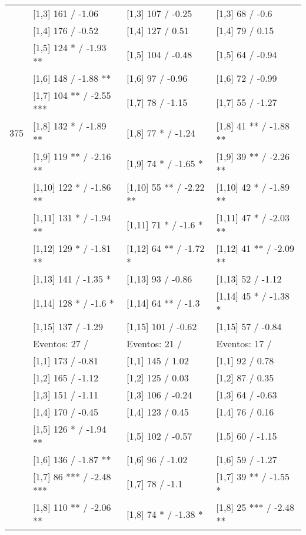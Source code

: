 \begin{table}
\begin{tabular}[t]{llll}
 & {}[1,3] 161  / -1.06 & {}[1,3] 107  / -0.25 & {}[1,3] 68  / -0.6\\
\addlinespace
 & {}[1,4] 176  / -0.52 & {}[1,4] 127  / 0.51 & {}[1,4] 79  / 0.15\\
 & {}[1,5] 124 * / -1.93 ** & {}[1,5] 104  / -0.48 & {}[1,5] 64  / -0.94\\
 & {}[1,6] 148  / -1.88 ** & {}[1,6] 97  / -0.96 & {}[1,6] 72  / -0.99\\
 & {}[1,7] 104 ** / -2.55 *** & {}[1,7] 78  / -1.15 & {}[1,7] 55  / -1.27\\
375 & {}[1,8] 132 * / -1.89 ** & {}[1,8] 77 * / -1.24 & {}[1,8] 41 ** / -1.88 **\\
\addlinespace
 & {}[1,9] 119 ** / -2.16 ** & {}[1,9] 74 * / -1.65 * & {}[1,9] 39 ** / -2.26 **\\
 & {}[1,10] 122 * / -1.86 ** & {}[1,10] 55 ** / -2.22 ** & {}[1,10] 42 * / -1.89 **\\
 & {}[1,11] 131 * / -1.94 ** & {}[1,11] 71 * / -1.6 * & {}[1,11] 47 * / -2.03 **\\
 & {}[1,12] 129 * / -1.81 ** & {}[1,12] 64 ** / -1.72 * & {}[1,12] 41 ** / -2.09 **\\
 & {}[1,13] 141  / -1.35 * & {}[1,13] 93  / -0.86 & {}[1,13] 52  / -1.12\\
\addlinespace
 & {}[1,14] 128 * / -1.6 * & {}[1,14] 64 ** / -1.3 & {}[1,14] 45 * / -1.38 *\\
 & {}[1,15] 137  / -1.29 & {}[1,15] 101  / -0.62 & {}[1,15] 57  / -0.84\\
 & Eventos:  27 / & Eventos:  21 / & Eventos:  17 /\\
 & {}[1,1] 173  / -0.81 & {}[1,1] 145  / 1.02 & {}[1,1] 92  / 0.78\\
 & {}[1,2] 165  / -1.12 & {}[1,2] 125  / 0.03 & {}[1,2] 87  / 0.35\\
\addlinespace
 & {}[1,3] 151  / -1.11 & {}[1,3] 106  / -0.24 & {}[1,3] 64  / -0.63\\
 & {}[1,4] 170  / -0.45 & {}[1,4] 123  / 0.45 & {}[1,4] 76  / 0.16\\
 & {}[1,5] 126 * / -1.94 ** & {}[1,5] 102  / -0.57 & {}[1,5] 60  / -1.15\\
 & {}[1,6] 136  / -1.87 ** & {}[1,6] 96  / -1.02 & {}[1,6] 59  / -1.27\\
 & {}[1,7] 86 *** / -2.48 *** & {}[1,7] 78  / -1.1 & {}[1,7] 39 ** / -1.55 *\\
\addlinespace
500 & {}[1,8] 110 ** / -2.06 ** & {}[1,8] 74 * / -1.38 * & {}[1,8] 25 *** / -2.48 **\\

\end{tabular}
\end{table}
